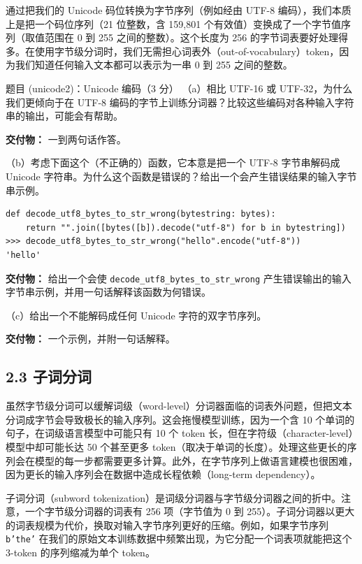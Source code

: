 通过把我们的 Unicode 码位转换为字节序列（例如经由 UTF-8 编码），我们本质上是把一个码位序列（21 位整数，含 159{,}801 个有效值）变换成了一个字节值序列（取值范围在 0 到 255 之间的整数）。这个长度为 256 的字节词表要好处理得多。在使用字节级分词时，我们无需担心词表外（out-of-vocabulary）token，因为我们知道任何输入文本都可以表示为一串 0 到 255 之间的整数。

\begin{problembox}{题目 (unicode2)：Unicode 编码（3 分）}
（a）相比 UTF-16 或 UTF-32，为什么我们更倾向于在 UTF-8 编码的字节上训练分词器？比较这些编码对各种输入字符串的输出，可能会有帮助。

\textbf{交付物：} 一到两句话作答。

（b）考虑下面这个（不正确的）函数，它本意是把一个 UTF-8 字节串解码成 Unicode 字符串。为什么这个函数是错误的？给出一个会产生错误结果的输入字节串示例。

\begin{lstlisting}
def decode_utf8_bytes_to_str_wrong(bytestring: bytes):
    return "".join([bytes([b]).decode("utf-8") for b in bytestring])
>>> decode_utf8_bytes_to_str_wrong("hello".encode("utf-8"))
'hello'
\end{lstlisting}

\textbf{交付物：} 给出一个会使 \texttt{decode\_utf8\_bytes\_to\_str\_wrong} 产生错误输出的输入字节串示例，并用一句话解释该函数为何错误。

（c）给出一个不能解码成任何 Unicode 字符的双字节序列。

\textbf{交付物：} 一个示例，并附一句话解释。
\end{problembox}

\subsection*{2.3 子词分词}

虽然字节级分词可以缓解词级（word-level）分词器面临的词表外问题，但把文本分词成字节会导致极长的输入序列。这会拖慢模型训练，因为一个含 10 个单词的句子，在词级语言模型中可能只有 10 个 token 长，但在字符级（character-level）模型中却可能长达 50 个甚至更多 token（取决于单词的长度）。处理这些更长的序列会在模型的每一步都需要更多计算。此外，在字节序列上做语言建模也很困难，因为更长的输入序列会在数据中造成长程依赖（long-term dependency）。

子词分词（subword tokenization）是词级分词器与字节级分词器之间的折中。注意，一个字节级分词器的词表有 256 项（字节值为 0 到 255）。子词分词器以更大的词表规模为代价，换取对输入字节序列更好的压缩。例如，如果字节序列 \texttt{b'the'} 在我们的原始文本训练数据中频繁出现，为它分配一个词表项就能把这个 3-token 的序列缩减为单个 token。


